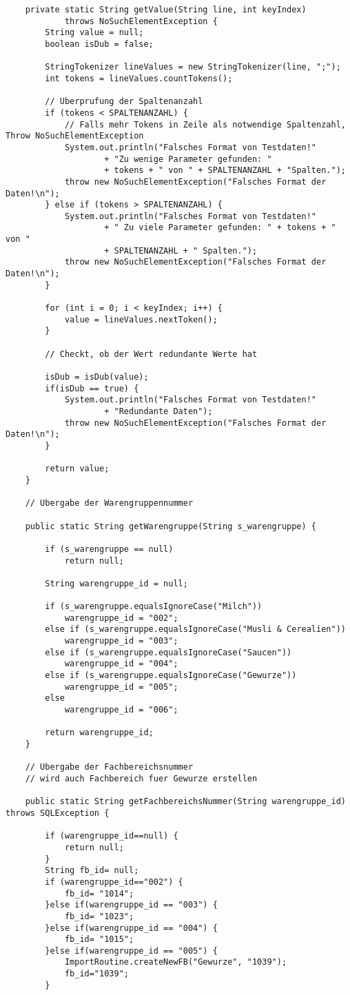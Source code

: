 \begin{lstlisting}
	private static String getValue(String line, int keyIndex)
			throws NoSuchElementException {
		String value = null;
		boolean isDub = false;

		StringTokenizer lineValues = new StringTokenizer(line, ";");
		int tokens = lineValues.countTokens();

		// Uberprufung der Spaltenanzahl
		if (tokens < SPALTENANZAHL) {
			// Falls mehr Tokens in Zeile als notwendige Spaltenzahl, Throw NoSuchElementException
			System.out.println("Falsches Format von Testdaten!"
					+ "Zu wenige Parameter gefunden: "
					+ tokens + " von " + SPALTENANZAHL + "Spalten.");
			throw new NoSuchElementException("Falsches Format der Daten!\n");
		} else if (tokens > SPALTENANZAHL) {
			System.out.println("Falsches Format von Testdaten!"
					+ " Zu viele Parameter gefunden: " + tokens + " von "
					+ SPALTENANZAHL + " Spalten.");
			throw new NoSuchElementException("Falsches Format der Daten!\n");
		}

		for (int i = 0; i < keyIndex; i++) {
			value = lineValues.nextToken();
		}

		// Checkt, ob der Wert redundante Werte hat

		isDub = isDub(value);
		if(isDub == true) {
			System.out.println("Falsches Format von Testdaten!"
					+ "Redundante Daten");
			throw new NoSuchElementException("Falsches Format der Daten!\n");
		}

		return value;
	}

	// Ubergabe der Warengruppennummer

	public static String getWarengruppe(String s_warengruppe) {

		if (s_warengruppe == null)
			return null;

		String warengruppe_id = null;

		if (s_warengruppe.equalsIgnoreCase("Milch"))
			warengruppe_id = "002";
		else if (s_warengruppe.equalsIgnoreCase("Musli & Cerealien"))
			warengruppe_id = "003";
		else if (s_warengruppe.equalsIgnoreCase("Saucen"))
			warengruppe_id = "004";
		else if (s_warengruppe.equalsIgnoreCase("Gewurze"))
			warengruppe_id = "005";
		else
			warengruppe_id = "006";

		return warengruppe_id;
	}

	// Ubergabe der Fachbereichsnummer
	// wird auch Fachbereich fuer Gewurze erstellen

	public static String getFachbereichsNummer(String warengruppe_id) throws SQLException {

		if (warengruppe_id==null) {
			return null;
		}
		String fb_id= null;
		if (warengruppe_id=="002") {
			fb_id= "1014";
		}else if(warengruppe_id == "003") {
			fb_id= "1023";
		}else if(warengruppe_id == "004") {
			fb_id= "1015";
		}else if(warengruppe_id == "005") {
			ImportRoutine.createNewFB("Gewurze", "1039");
			fb_id="1039";
		}


\end{lstlisting}
